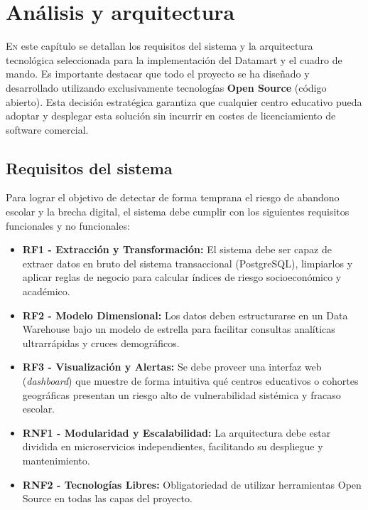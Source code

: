 \chapter{Análisis y arquitectura}
\label{chap:analisis_arquitectura}

\lettrine{E}{n} este capítulo se detallan los requisitos del sistema y la arquitectura tecnológica seleccionada para la implementación del Datamart y el cuadro de mando. Es importante destacar que todo el proyecto se ha diseñado y desarrollado utilizando exclusivamente tecnologías \textbf{Open Source} (código abierto). Esta decisión estratégica garantiza que cualquier centro educativo pueda adoptar y desplegar esta solución sin incurrir en costes de licenciamiento de software comercial.

\section{Requisitos del sistema}

Para lograr el objetivo de detectar de forma temprana el riesgo de abandono escolar y la brecha digital, el sistema debe cumplir con los siguientes requisitos funcionales y no funcionales:

\begin{itemize}
    \item \textbf{RF1 - Extracción y Transformación:} El sistema debe ser capaz de extraer datos en bruto del sistema transaccional (PostgreSQL), limpiarlos y aplicar reglas de negocio para calcular índices de riesgo socioeconómico y académico.
    \item \textbf{RF2 - Modelo Dimensional:} Los datos deben estructurarse en un Data Warehouse bajo un modelo de estrella para facilitar consultas analíticas ultrarrápidas y cruces demográficos.
    \item \textbf{RF3 - Visualización y Alertas:} Se debe proveer una interfaz web (\textit{dashboard}) que muestre de forma intuitiva qué centros educativos o cohortes geográficas presentan un riesgo alto de vulnerabilidad sistémica y fracaso escolar.
    \item \textbf{RNF1 - Modularidad y Escalabilidad:} La arquitectura debe estar dividida en microservicios independientes, facilitando su despliegue y mantenimiento.
    \item \textbf{RNF2 - Tecnologías Libres:} Obligatoriedad de utilizar herramientas Open Source en todas las capas del proyecto.
\end{itemize}

